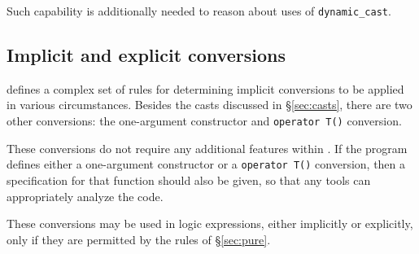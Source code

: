 Such capability is additionally needed to reason about uses of \lstinline|dynamic_cast|.

\subsection{Implicit and explicit conversions}

\lang defines a complex set of rules for determining implicit conversions to be applied in various circumstances. Besides the casts discussed in \S\ref{sec:casts}, there are two other conversions: the one-argument constructor and \lstinline|operator T()| conversion. 

These conversions do not require any additional features within 
\NAME. If the program defines either a one-argument constructor or a
\lstinline|operator T()| conversion, then a specification for that
function should also be given, so that any \NAME tools can appropriately analyze the code.

These conversions may be used in logic expressions, either implicitly or explicitly, only if they are permitted by the rules of \S\ref{sec:pure}. 

